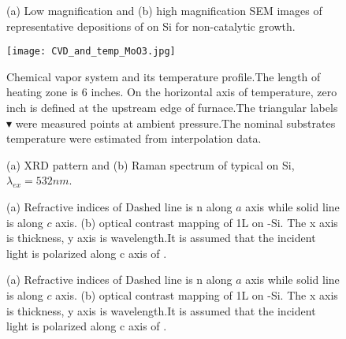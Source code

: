 \begin{figure}[htb]
\centering
{}\hspace{0.04\textwidth}
\caption[Representative morphologies of  on Si]{(a) Low magnification and (b) high magnification SEM images of representative depositions of  on Si for non-catalytic growth.}
\label{fig:mosisem}
\end{figure}

\begin{figure}[htb]
\centering
\texttt{[image: CVD\_and\_temp\_MoO3.jpg]}
\caption[CVD system]{Chemical vapor system and its temperature profile.The length of heating zone is 6 inches. On the horizontal axis of temperature, zero inch is defined at the upstream edge of furnace.The triangular labels $\blacktriangledown$ were measured points at ambient pressure.The nominal substrates temperature were estimated from interpolation data.}
\label{fig:s1}
\end{figure}

\begin{figure}[htb]
\centering
{}%
\caption[Crystalline phase characterization of  on Si]{(a) XRD pattern and (b) Raman spectrum of typical  on Si, $\lambda_{ex} = 532nm$.}
\label{fig:mooxch}
\end{figure}

\begin{figure}[htb]
\centering
{}%
\caption[Refractive indices of ]{(a) Refractive indices of  Dashed line is n along $a$ axis while solid line is along $c$ axis. (b) optical contrast mapping of 1L  on -Si. The x axis is  thickness, y axis is wavelength.It is assumed that the incident light is polarized along c axis of .}
\label{fig:mofl}
\end{figure}

\begin{figure}[htb]
\centering
{}%
\caption[Refractive indices of ]{(a) Refractive indices of  Dashed line is n along $a$ axis while solid line is along $c$ axis. (b) optical contrast mapping of 1L  on -Si. The x axis is  thickness, y axis is wavelength.It is assumed that the incident light is polarized along c axis of .}
\label{fig:mofl}
\end{figure}

